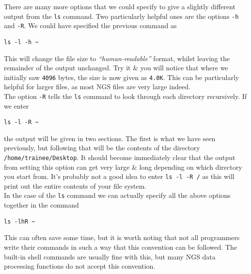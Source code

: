 \documentclass[a4paper,12pt,twoside]{memoir}
\begin{document}
\begin{advanced}
There are many more options that we could specify to give a slightly different output from the \texttt{ls} command.
Two particularly helpful ones are the options \texttt{-h} and
\texttt{-R}.
We could have specified the previous command as \\
\begin{lstlisting}
ls -l -h ~
\end{lstlisting}

This will change the file size to \textit{``human-readable''} format, whilst leaving the remainder of the output unchanged.
Try it \& you will notice that where we initially saw \texttt{4096} bytes, the size is now given as \texttt{4.0K}.
This can be particularly helpful for larger files, as most NGS files are very large indeed.\\

The option \texttt{-R} tells the \texttt{ls} command to look through each directory recursively.
If we enter \\
\begin{lstlisting}
ls -l -R ~
\end{lstlisting}

the output will be given in two sections.
The first is what we have seen previously, but following that will be the contents of the directory \texttt{/home/trainee/Desktop}.
It should become immediately clear that the output from setting this option can get very large \& long depending on which directory you start from.
It's probably not a good idea to enter \texttt{ls -l -R /} as this will print out the entire contents of your file system. \\

In the case of the \texttt{ls} command we can actually specify all the above options together in the command \\
\begin{lstlisting}
ls -lhR ~
\end{lstlisting}

This can often save some time, but it is worth noting that not all programmers write their commands in such a way that this convention can be followed.
The built-in shell commands are usually fine with this, but many NGS data processing functions do not accept this convention. \\
\end{advanced}
\end{document}
